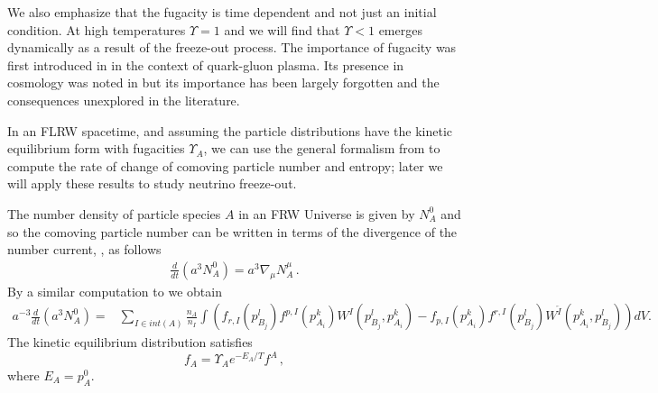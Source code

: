 We also emphasize that the fugacity is time dependent and not just an initial condition. At high temperatures $\Upsilon=1$ and we will find that $\Upsilon<1$ emerges dynamically as a result of the freeze-out process. The importance of fugacity was first introduced in \cite{Rafelski:1982pu} in the context of quark-gluon plasma. Its presence in cosmology was noted in \cite{Bernstein:1985th,Dolgov:1992wf} but its importance has been largely forgotten and the consequences unexplored in the literature. 

In an FLRW spacetime, and assuming the particle distributions have the kinetic equilibrium form  with fugacities $\Upsilon_{A}$, we can use the general formalism from  to compute the rate of change of comoving particle number and entropy; later we will apply these results to study neutrino freeze-out.

The number density of particle species $A$ in an FRW Universe is given by $N_A^0$ and so the comoving particle number can be written in terms of the divergence of the number current, , as follows
\begin{align}
\frac{d}{dt}(a^3N^0_A)=a^{3} \nabla_\mu N_A^\mu\,. 
\end{align}
By a similar computation to  we obtain
\begin{align}\label{eq:FRWcomovingNumGen}
a^{-3}\frac{d}{dt}(a^3N^0_A)=&\sum_{I\in int(A)} \frac{n_A}{n_I}\int\left(f_{r,I}(p_{B_j}^l)f^{p,I}(p_{A_i}^k)W^I(p_{B_j}^l,p_{A_i}^k) 
-f_{p,I}(p_{A_i}^k)f^{r,I}(p_{B_j}^l)W^{\overleftarrow{I}}(p_{A_i}^k,p_{B_j}^l)\right) dV.
\end{align}
The kinetic equilibrium distribution satisfies
\begin{equation}
f_A=\Upsilon_A e^{-E_A/T}f^A\,,
\end{equation}
where $E_A=p_A^0$. 

